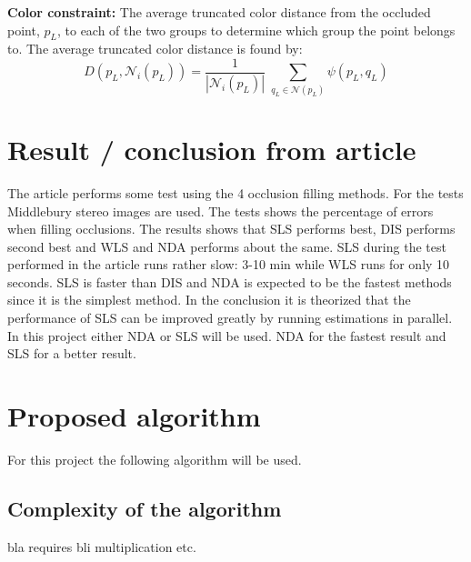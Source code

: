 \textbf{Color constraint:} The average truncated color distance from the occluded point, $p_L$, to each of the two groups to determine which group the point belongs to. The average truncated color distance is found by:
\begin{equation}
D(p_L,\mathcal{N}_i(p_L) ) = \dfrac{1}{|\mathcal{N}_i(p_L)|} \; \sum_{q_L \in \mathcal{N}(p_L)} \psi (p_L,q_L) 
\end{equation}

\section{Result / conclusion from article}
The article performs some test using the 4 occlusion filling methods. For the tests Middlebury stereo images are used. The tests shows the percentage of errors when filling occlusions. The results shows that SLS performs best, DIS performs second best and WLS and NDA performs about the same. SLS during the test performed in the article runs rather slow: 3-10 min while WLS runs for only 10 seconds. SLS is faster than DIS and NDA is expected to be the fastest methods since it is the simplest method. In the conclusion it is theorized that the performance of SLS can be improved greatly by running estimations in parallel. \\
In this project either NDA or SLS will be used. NDA for the fastest result and SLS for a better result.

\section{Proposed algorithm}
For this project the following algorithm will be used. 

\subsection{Complexity of the algorithm}
bla requires bli multiplication etc.



